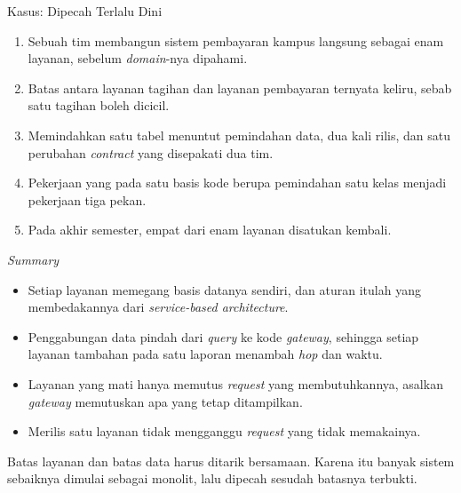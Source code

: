 \documentclass[aspectratio=169, table, 12pt]{beamer}
\begin{document}
\begin{frame}{{\Large Kasus: Dipecah Terlalu Dini}}
  \vspace{8pt}
  \begin{enumerate}\small
    \item Sebuah tim membangun sistem pembayaran kampus langsung sebagai enam
          layanan, sebelum \textit{domain}-nya dipahami.
    \item Batas antara layanan tagihan dan layanan pembayaran ternyata keliru,
          sebab satu tagihan boleh dicicil.
    \item Memindahkan satu tabel menuntut pemindahan data, dua kali rilis, dan
          satu perubahan \textit{contract} yang disepakati dua tim.
    \item Pekerjaan yang pada satu basis kode berupa pemindahan satu kelas
          menjadi pekerjaan tiga pekan.
    \item Pada akhir semester, empat dari enam layanan disatukan kembali.
  \end{enumerate}
\end{frame}

\begin{frame}{{\Large \textit{Summary}}}
  \vspace{8pt}
  \begin{itemize}\small
    \item Setiap layanan memegang basis datanya sendiri, dan aturan itulah
          yang membedakannya dari \textit{service-based architecture}.
    \item Penggabungan data pindah dari \textit{query} ke kode
          \textit{gateway}, sehingga setiap layanan tambahan pada satu laporan
          menambah \textit{hop} dan waktu.
    \item Layanan yang mati hanya memutus \textit{request} yang
          membutuhkannya, asalkan \textit{gateway} memutuskan apa yang tetap
          ditampilkan.
    \item Merilis satu layanan tidak mengganggu \textit{request} yang tidak
          memakainya.
  \end{itemize}

  \vspace{8pt}
  {\small Batas layanan dan batas data harus ditarik bersamaan. Karena itu
  banyak sistem sebaiknya dimulai sebagai monolit, lalu dipecah sesudah
  batasnya terbukti.}
\end{frame}
\end{document}
